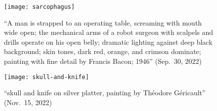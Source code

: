 \begin{figure}[H]
\begin{minipage}[t]{0.48\textwidth}
    \centering
    \texttt{[image: sarcophagus]}
    \caption{``A man is strapped to an operating table, screaming with mouth
        wide open; the mechanical arms of a robot surgeon with scalpels and
        drills operate on his open belly; dramatic lighting against deep black
        background; skin tones, dark red, orange, and crimson dominate; painting
        with fine detail by Francis Bacon; 1946'' (Sep.\ 30, 2022)}
\end{minipage}
\hfill
\begin{minipage}[t]{0.48\textwidth}
    \centering
    \texttt{[image: skull-and-knife]}
    \caption{``skull and knife on silver platter, painting by Théodore
        Géricault'' (Nov.\ 15, 2022)}
    \label{fig:dalle:gen10}
\end{minipage}
\end{figure}
